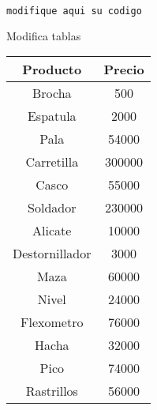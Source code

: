 \documentclass[12pt]{article}
\newenvironment{question}[2][Pregunta]{\begin{trivlist}
\item[\hskip \labelsep {\bfseries #1}\hskip \labelsep {\bfseries #2.}]}{\end{trivlist}}
\begin{document}
\begin{lstlisting}[language=Python]
modifique aqui su codigo
\end{lstlisting}
\begin{question}{9}
Modifica tablas
\begin{center}
    \begin{tabular}{|c|c|}
    \hline
         \textbf{Producto} & \textbf{Precio} \\
        \hline
         Brocha & 500  \\
         \hline
         Espatula & 2000 \\
         \hline
         Pala & 54000 \\
         \hline
         Carretilla & 300000 \\
         \hline
         Casco & 55000 \\
         \hline
         Soldador & 230000 \\
         \hline
         Alicate & 10000 \\
         \hline
         Destornillador & 3000 \\
         \hline
         Maza & 60000 \\
         \hline
         Nivel & 24000 \\
         \hline
         Flexometro & 76000 \\
         \hline
         Hacha & 32000 \\
         \hline
         Pico & 74000 \\
         \hline
         Rastrillos & 56000\\
         \hline
         
    \end{tabular}
\end{center}
\end{question}
\end{document}
